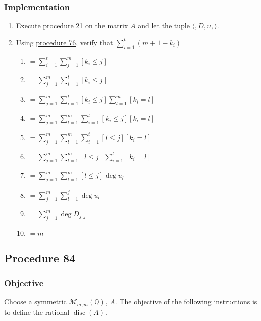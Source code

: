 \documentclass[twocolumn]{article}
\DeclareMathOperator{\disc}{disc}
\begin{document}
			\subsubsection{Implementation}
				\begin{enumerate}
					\item Execute \hyperref[sec:procedure 21]{procedure 21} on the matrix $A$ and let the tuple $\langle,D,u,\rangle$.
					\item Using \hyperref[sec:procedure 76]{procedure 76}, verify that $\sum_{i=1}^t(m+1-k_i)$
					\begin{enumerate}
						\item $=\sum_{i=1}^t\sum_{j=1}^m [k_i\le j]$
						\item $=\sum_{j=1}^m\sum_{i=1}^t [k_i\le j]$
						\item $=\sum_{j=1}^m\sum_{i=1}^t [k_i\le j]\sum_{l=1}^m [k_i=l]$
						\item $=\sum_{j=1}^m\sum_{l=1}^m\sum_{i=1}^t [k_i\le j][k_i=l]$
						\item $=\sum_{j=1}^m\sum_{l=1}^m\sum_{i=1}^t [l\le j][k_i=l]$
						\item $=\sum_{j=1}^m\sum_{l=1}^m [l\le j]\sum_{i=1}^t [k_i=l]$
						\item $=\sum_{j=1}^m\sum_{l=1}^m [l\le j]\deg u_l$
						\item $=\sum_{j=1}^m\sum_{l=1}^j \deg u_l$
						\item $=\sum_{j=1}^m \deg D_{j,j}$
						\item $=m$
					\end{enumerate}
				\end{enumerate}
		\subsection{Procedure 84}\label{sec:procedure 84}
			\subsubsection{Objective}
				Choose a symmetric $\mathcal{M}_{m,m}(\mathbb{Q})$, $A$. The objective of the following instructions is to define the rational $\disc(A)$.
\end{document}
